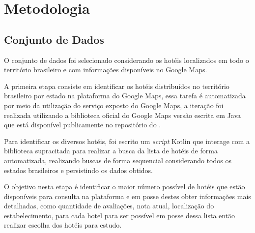 \chapter{Metodologia}
\label{cap:metodologia}


\section{Conjunto de Dados}
\label{cap:metodologia:sec:conjunto_dados}


O conjunto de dados foi selecionado considerando os hotéis localizados em todo o território brasileiro e com informações disponíveis no Google Maps.

A primeira etapa consiste em identificar os hotéis distribuídos no território brasileiro por estado na plataforma do Google Maps, essa tarefa é automatizada por meio da utilização do serviço exposto do Google Maps, a iteração foi realizada utilizando a biblioteca oficial do Google Maps versão escrita em Java que está disponível publicamente no repositório do .

Para identificar os diversos hotéis, foi escrito um \emph{script} Kotlin \cite{scriptKotlinBuscarHoteis} que interage com a biblioteca supracitada para realizar a busca da lista de hotéis de forma automatizada, realizando buscas de forma sequencial considerando todos os estados brasileiros e persistindo os dados obtidos.

O objetivo nesta etapa é identificar o maior número possível de hotéis que estão disponíveis para consulta na plataforma e em posse destes obter informações mais detalhadas, como quantidade de avaliações, nota atual, localização do estabelecimento, para cada hotel para ser possível em posse dessa lista então realizar escolha dos hotéis para estudo.

